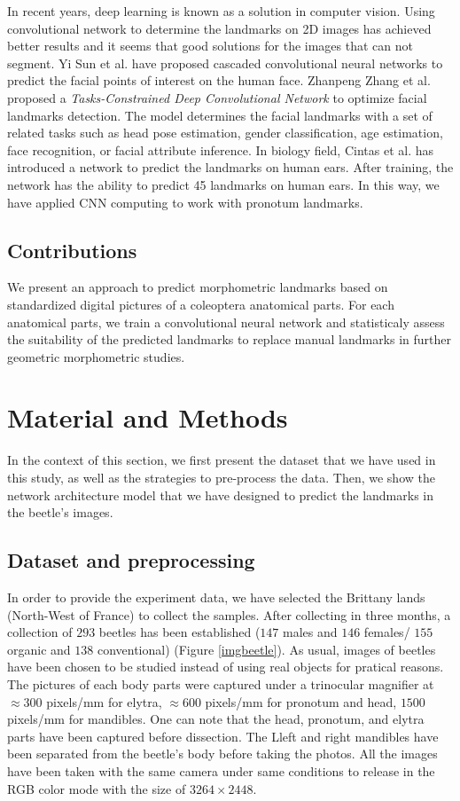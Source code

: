 \documentclass[review]{elsarticle}
\begin{document}
In recent years, deep learning is known as a solution in computer vision. Using convolutional network to determine the landmarks on 2D images has achieved better results and it seems that good solutions for the images that can not segment. Yi Sun et al. \cite{sun2013deep} have proposed cascaded convolutional neural networks to predict the facial points of interest on the human face.
Zhanpeng Zhang et al. \cite{zhang2014facial} proposed a \textit{Tasks-Constrained Deep Convolutional Network} to optimize facial landmarks detection. The model determines the facial landmarks with a set of related tasks such as head pose estimation, gender classification, age estimation, face recognition, or facial attribute inference. In biology field, Cintas et al. \cite{cintas2016automatic} has introduced a network to predict the landmarks on human ears. After training, the network has the ability to predict 45 landmarks on human ears. In this way, we have applied CNN computing to work with pronotum landmarks.

\subsection{Contributions}

We present an approach to predict morphometric landmarks based on standardized digital pictures of a coleoptera anatomical parts. For each anatomical parts, we train a convolutional neural network and statisticaly assess the suitability of the predicted landmarks to replace manual landmarks in further geometric morphometric studies.

\section{Material and Methods}

In the context of this section, we first present the dataset that we have used in this study, as well as the strategies to pre-process the data. Then, we show the network architecture model that we have designed to predict the landmarks in the beetle's images.

\subsection{Dataset and preprocessing}
In order to provide the experiment data, we have selected the Brittany lands (North-West of France) to collect the samples. After collecting in three months, a collection of $293$ beetles has been established ($147$ males and $146$ females/ $155$ organic and $138$ conventional) (Figure \ref{imgbeetle}). As usual, images of beetles have been chosen to be studied instead of using real objects for pratical reasons. The pictures of each body parts were captured under a trinocular magnifier at $\approx 300$ pixels/mm for elytra, $\approx 600$ pixels/mm for pronotum and head, $1500$ pixels/mm for mandibles. One can note that the head, pronotum, and elytra parts have been captured before dissection. The Lleft and right mandibles have been separated from the beetle's body before taking the photos. All the images have been taken with the same camera under same conditions to release in the RGB color mode with the size of $3264 \times 2448$.
\end{document}
